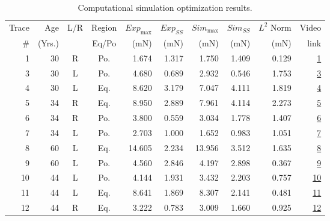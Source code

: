 \begin{table}[tbp]
    \centering
    \caption{Computational simulation optimization results.}
    \label{tab:Summary_Table}
    \begin{tabular}{rrccrrrrrr}
    \toprule
     Trace &  Age    & L/R & Region & $Exp_{\max}$ &  $Exp_{SS}$ & $Sim_{\max}$ &  $Sim_{SS}$ &  $L^2$ Norm & Video \\
     \#    &  (Yrs.) &     &  Eq/Po & (mN)         & (mN)        & (mN)         & (mN)        & (mN)        & link \\
    \midrule
     1 &   30 &   R &    Po. &       1.674 &       1.317 &       1.750 &       1.409 &       0.129 &  \href{https://youtu.be/9pKFyh3mmBs}{1} \\
     3 &   30 &   L &    Po. &       4.680 &       0.689 &       2.932 &       0.546 &       1.753 &  \href{https://youtu.be/2N1eskSYjQU}{3} \\
     4 &   30 &   L &    Eq. &       8.620 &       3.179 &       7.047 &       4.111 &       1.819 &  \href{https://youtu.be/8iYNJnkKTRI}{4} \\
     5 &   34 &   R &    Eq. &       8.950 &       2.889 &       7.961 &       4.114 &       2.273 &  \href{https://youtu.be/0JSQvRDfeeI}{5} \\
     6 &   34 &   R &    Po. &       3.800 &       0.559 &       3.034 &       1.778 &       1.407 &  \href{https://youtu.be/0eEr9P5FR1M}{6} \\
     7 &   34 &   L &    Po. &       2.703 &       1.000 &       1.652 &       0.983 &       1.051 &  \href{https://youtu.be/WuFbMddlkm0}{7} \\
     8 &   60 &   L &    Eq. &      14.605 &       2.234 &      13.956 &       3.512 &       1.635 &  \href{https://youtu.be/T8A5u71nr00}{8} \\
     9 &   60 &   L &    Po. &       4.560 &       2.846 &       4.197 &       2.898 &       0.367 &  \href{https://youtu.be/X-zlsxrsNfI}{9} \\
    10 &   44 &   L &    Po. &       4.144 &       1.931 &       3.432 &       2.203 &       0.757 & \href{https://youtu.be/D_2NWrmxTA8}{10} \\
    11 &   44 &   L &    Eq. &       8.641 &       1.869 &       8.307 &       2.141 &       0.481 & \href{https://youtu.be/dNkyzySpsc8}{11} \\
    12 &   44 &   R &    Eq. &       3.222 &       0.783 &       3.009 &       1.660 &       0.925 & \href{https://youtu.be/rNquPkOmOYA}{12} \\

\end{tabular}
\end{table}
